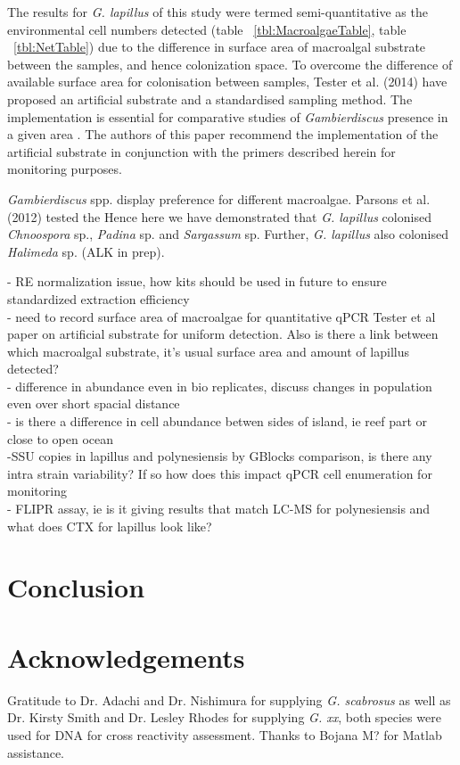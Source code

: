 \documentclass[12pt]{article}
\begin{document}
The results for \emph{G. lapillus} of this study were termed semi-quantitative as the environmental cell numbers detected (table ~\ref{tbl:MacroalgaeTable}, table ~\ref{tbl:NetTable})  due to the difference in surface area of macroalgal substrate between the samples, and hence colonization space. To overcome the difference of available surface area for colonisation between samples, Tester et al. (2014) have proposed an artificial substrate and a standardised sampling method. The implementation is essential for comparative studies of \emph{Gambierdiscus} presence in a  given area \cite{tester2014sampling}. The authors of this paper recommend the implementation of the artificial substrate in conjunction with the primers described herein for monitoring purposes.

\emph{Gambierdiscus} spp. display preference for different macroalgae. Parsons et al. (2012) tested the 
Hence here we have demonstrated that \emph{G. lapillus} colonised \emph{Chnoospora} sp., \emph{Padina} sp. and \emph{Sargassum} sp. Further, \emph{G. lapillus} also colonised \emph{Halimeda} sp. (ALK in prep).


- RE normalization issue, how kits should be used in future to ensure standardized extraction efficiency\\
- need to record surface area of macroalgae for quantitative qPCR Tester et al paper on artificial substrate for uniform detection. Also is there a link between which macroalgal substrate, it's usual surface area and amount of lapillus detected?\\
- difference in abundance even in bio replicates, discuss changes in population even over short spacial distance\\
- is there a difference in cell abundance betwen sides of island, ie reef part or close to open ocean\\
-SSU copies in lapillus and polynesiensis by GBlocks comparison, is there any intra strain variability? If so how does this impact qPCR cell enumeration for monitoring\\
- FLIPR assay, ie is it giving results that match LC-MS for polynesiensis and what does CTX for lapillus look like?
\newpage
\section{Conclusion}
\section{Acknowledgements}
Gratitude to Dr. Adachi and Dr. Nishimura for supplying \emph{G. scabrosus} as well as Dr. Kirsty Smith and Dr. Lesley Rhodes for supplying \emph{G. xx}, both species were used for DNA for cross reactivity assessment. Thanks to Bojana M? for Matlab assistance.
\FloatBarrier
\newpage


\end{document}
